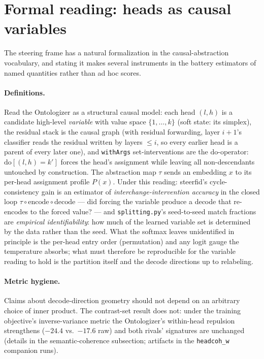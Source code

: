 \documentclass[11pt]{article}
\begin{document}
\section{Formal reading: heads as causal variables}

The steering frame has a natural formalization in the causal-abstraction
vocabulary, and stating it makes several instruments in the battery
estimators of named quantities rather than ad hoc scores.

\paragraph{Definitions.}
Read the Ontologizer as a structural causal model: each head $(l,h)$ is a
candidate high-level \emph{variable} with value space $\{1,\dots,k\}$
(soft state: its simplex), the residual stack is the causal graph (with
residual forwarding, layer $i{+}1$'s classifier reads the residual
written by layers $\le i$, so every earlier head is a parent of every
later one), and \texttt{withArgs} set-interventions are the
$\mathrm{do}$-operator: $\mathrm{do}[(l,h){=}k']$ forces the head's
assignment while leaving all non-descendants untouched by construction.
The abstraction map $\tau$ sends an embedding $x$ to its per-head
assignment profile $P(x)$. Under this reading: steerfid's
cycle-consistency gain is an estimator of \emph{interchange-intervention
accuracy} in the closed loop $\tau \circ \mathrm{encode} \circ
\mathrm{decode}$ --- did forcing the variable produce a decode that
re-encodes to the forced value? --- and \texttt{splitting.py}'s
seed-to-seed match fractions are \emph{empirical identifiability}: how
much of the learned variable set is determined by the data rather than
the seed. What the softmax leaves unidentified in principle is the
per-head entry order (permutation) and any logit gauge the temperature
absorbs; what must therefore be reproducible for the variable reading to
hold is the partition itself and the decode directions up to relabeling.

\paragraph{Metric hygiene.}
Claims about decode-direction geometry should not depend on an arbitrary
choice of inner product. The contrast-set result does not: under the
training objective's inverse-variance metric the Ontologizer's
within-head repulsion strengthens ($-24.4$ vs.\ $-17.6$ raw) and both
rivals' signatures are unchanged (details in the semantic-coherence
subsection; artifacts in the \texttt{headcoh\_w} companion runs).
\end{document}
